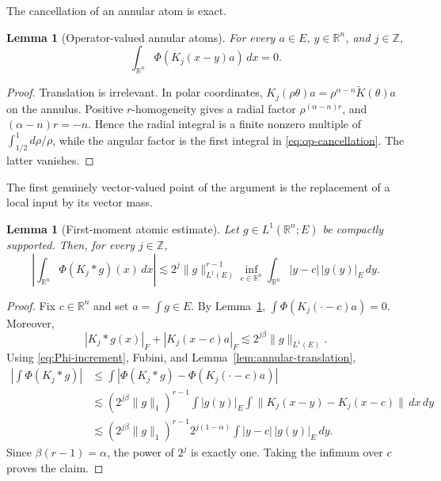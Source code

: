 \documentclass[10pt,a4paper]{amsart}
\numberwithin{equation}{section}
\newtheorem{lemma}[theorem]{Lemma}
\newcommand{\R}{\mathbb R}
\newcommand{\norm}[1]{\lVert #1\rVert}
\begin{document}
The cancellation of an annular atom is exact.

\begin{lemma}[Operator-valued annular atoms]\label{lem:annular-atoms}
For every $a\in E$, $y\in\R^n$, and $j\in\mathbb Z$,
\begin{equation}\label{eq:annular-atom}
 \int_{\R^n}\Phi(K_j(x-y)a)\,dx=0.
\end{equation}
\end{lemma}

\begin{proof}
Translation is irrelevant.  In polar coordinates,
$K_j(\rho\theta)a=\rho^{\alpha-n}\widetilde K(\theta)a$ on the annulus.
Positive $r$-homogeneity gives a radial factor
$\rho^{(\alpha-n)r}$, and $(\alpha-n)r=-n$.  Hence the radial integral is a
finite nonzero multiple of $\int_{1/2}^1d\rho/\rho$, while the angular factor
is the first integral in \eqref{eq:op-cancellation}.  The latter vanishes.
\end{proof}

The first genuinely vector-valued point of the argument is the replacement of
a local input by its vector mass.

\begin{lemma}[First-moment atomic estimate]\label{lem:first-moment-atom}
Let $g\in L^1(\R^n;E)$ be compactly supported.  Then, for every
$j\in\mathbb Z$,
\begin{equation}\label{eq:first-moment-atom}
 \left|\int_{\R^n}\Phi(K_j*g)(x)\,dx\right|
 \lesssim
 2^j\norm{g}_{L^1(E)}^{r-1}
 \inf_{c\in\R^n}\int_{\R^n}|y-c|\,|g(y)|_E\,dy.
\end{equation}
\end{lemma}

\begin{proof}
Fix $c\in\R^n$ and set $a=\int g\in E$.  By
Lemma~\ref{lem:annular-atoms},
$\int\Phi(K_j(\cdot-c)a)=0$.  Moreover,
\[
 |K_j*g(x)|_F+|K_j(x-c)a|_F
 \lesssim2^{j\beta}\norm g_{L^1(E)}.
\]
Using \eqref{eq:Phi-increment}, Fubini, and
Lemma~\ref{lem:annular-translation},
\begin{align*}
 \left|\int\Phi(K_j*g)\right|
 &\le \int\left|\Phi(K_j*g)-\Phi(K_j(\cdot-c)a)\right|\\
 &\lesssim
 (2^{j\beta}\norm g_1)^{r-1}
 \int |g(y)|_E
 \int\norm{K_j(x-y)-K_j(x-c)}\,dx\,dy\\
 &\lesssim
 (2^{j\beta}\norm g_1)^{r-1}
 2^{j(1-\alpha)}
 \int |y-c|\,|g(y)|_E\,dy.
\end{align*}
Since $\beta(r-1)=\alpha$, the power of $2^j$ is exactly one.  Taking the
infimum over $c$ proves the claim.
\end{proof}
\end{document}
